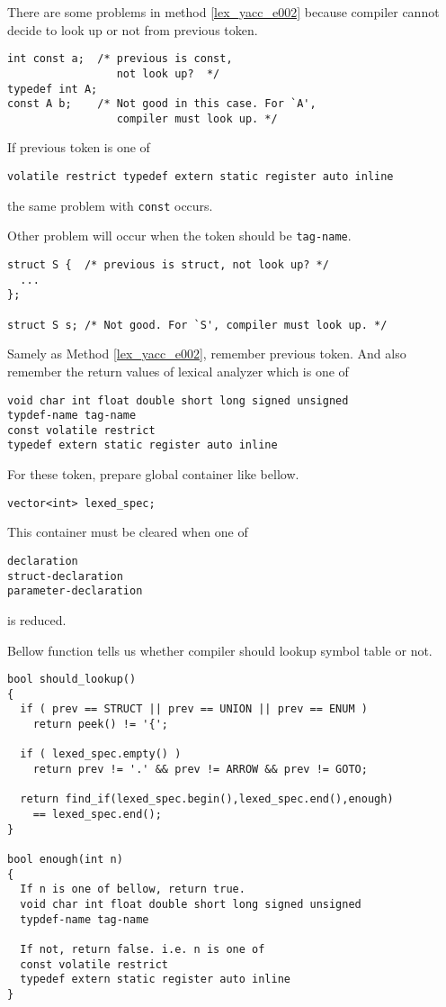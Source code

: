 There are some problems in method \ref{lex_yacc_e002} because
compiler cannot decide to look up or not from
previous token.

\begin{verbatim}
int const a;  /* previous is const,
                 not look up?  */
typedef int A;
const A b;    /* Not good in this case. For `A',
                 compiler must look up. */
\end{verbatim}
If previous token is one of
\begin{verbatim}
volatile restrict typedef extern static register auto inline
\end{verbatim}
the same problem with {\tt{const}} occurs.

Other problem will occur when the token
should be {\tt{tag-name}}.

\begin{verbatim}
struct S {  /* previous is struct, not look up? */
  ...
};

struct S s; /* Not good. For `S', compiler must look up. */
\end{verbatim}


\begin{Method}
\label{lex_yacc_e005}
Samely as Method \ref{lex_yacc_e002}, remember previous token.
And also remember the return values of lexical analyzer
which is one of
\begin{verbatim}
void char int float double short long signed unsigned
typdef-name tag-name
const volatile restrict
typedef extern static register auto inline
\end{verbatim}
For these token, prepare global container like bellow.
\begin{verbatim}
vector<int> lexed_spec;
\end{verbatim}
This container must be cleared when one of
\begin{verbatim}
declaration
struct-declaration
parameter-declaration
\end{verbatim}
is reduced.

Bellow function tells us whether compiler should lookup
symbol table or not.
\begin{verbatim}
bool should_lookup()
{
  if ( prev == STRUCT || prev == UNION || prev == ENUM )
    return peek() != '{';

  if ( lexed_spec.empty() )
    return prev != '.' && prev != ARROW && prev != GOTO;

  return find_if(lexed_spec.begin(),lexed_spec.end(),enough)
    == lexed_spec.end();
}

bool enough(int n)
{
  If n is one of bellow, return true.
  void char int float double short long signed unsigned
  typdef-name tag-name

  If not, return false. i.e. n is one of 
  const volatile restrict
  typedef extern static register auto inline
}
\end{verbatim}
\end{Method}


